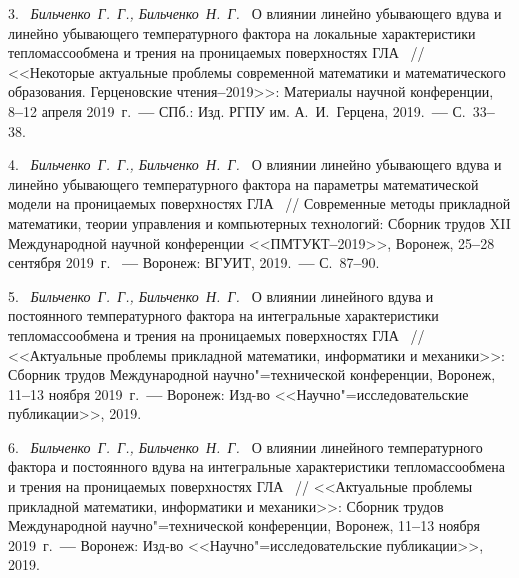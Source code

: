 3.~%
\textit%
{Бильченко~Г.~Г.,
 Бильченко~Н.~Г.~}
{%
  {О  влиянии
линейно  убывающего
вдува  и
линейно  убывающего
температурного  фактора
на  локальные  характеристики
тепломассообмена  и 	трения
на  проницаемых  поверхностях  ГЛА}%
~/$\!$/
  <<Некоторые  актуальные  проблемы
  современной  математики
  и  математического  образования.
    Герценовские  чтения{\textbf{--}}2019>>:
  Материалы  научной  конференции,
  8{\textbf{--}}12
  апреля  2019~г.~{\textbf{---}}
  СПб.:  Изд.  \mbox{РГПУ}  им.  А.~И.~Герцена,
  2019.~{\textbf{---}}
  С.~33{\textbf{--}}38.%
  }



4.~%
\textit%
{Бильченко~Г.~Г.,
 Бильченко~Н.~Г.~}
{%
  {О  влиянии
линейно  убывающего
вдува  и
линейно  убывающего
температурного  фактора
на  параметры  математической  модели
на  проницаемых  поверхностях  ГЛА}%
~/$\!$/
  Современные  методы  прикладной  математики,
  теории  управления  и  компьютерных  технологий:
  Сборник  трудов
  XII  Международной  научной
  конференции
  <<\mbox{ПМТУКТ}{\textbf{--}}2019>>,
  Воронеж,
  25{\textbf{--}}28
  сентября  2019~г.%
~{\textbf{---}}
  Воронеж:  ВГУИТ,
  2019.~{\textbf{---}}
  С.~87{\textbf{--}}90.%
  }



5.~%
\textit%
{Бильченко~Г.~Г.,
 Бильченко~Н.~Г.~}
{%
  {О  влиянии  линейного  вдува
и  постоянного  температурного  фактора
на  интегральные  характеристики  тепломассообмена
и  трения
на  проницаемых  поверхностях
ГЛА}%
~/$\!$/
  <<Актуальные  проблемы
   прикладной  математики,  информатики
   и  механики>>:
  Сборник  трудов  Международной
  научно"=технической  конференции,
  Воронеж,
  11{\textbf{--}}13
  ноября  2019~г.~{\textbf{---}}
  Воронеж:
  Изд-во  <<На\-уч\-но"=исследовательские  публикации>>,
  2019.%
  }



6.~%
\textit%
{Бильченко~Г.~Г.,
 Бильченко~Н.~Г.~}
{%
  {О  влиянии  линейного  температурного  фактора
и  постоянного  вдува
на  интегральные  характеристики  тепломассообмена
и  трения
на  проницаемых  поверхностях
ГЛА}%
~/$\!$/
  <<Актуальные  проблемы
   прикладной  математики,  информатики
   и  механики>>:
  Сборник  трудов  Международной
  научно"=технической  конференции,
  Воронеж,
  11{\textbf{--}}13
  ноября  2019~г.~{\textbf{---}}
  Воронеж:
  Изд-во  <<На\-уч\-но"=исследовательские  публикации>>,
  2019.%
  }



